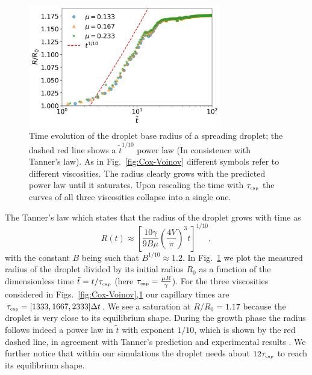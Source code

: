 \begin{figure}
    \centering
    \includegraphics[width=0.75\textwidth]{graphics/Fig_6_Tanners_law_slip_2_paper_rescaled_t.png}
    \caption{Time evolution of the droplet base radius of a spreading droplet; the dashed red line shows a $\tilde{t}^{1/10}$ power law (In consistence with Tanner's law). As in Fig.~\ref{fig:Cox-Voinov} different symbols refer to different viscosities. The radius clearly grows with the predicted power law until it saturates. Upon rescaling the time with $\tau_{\mbox{\tiny{cap}}}$ the curves of all three viscosities collapse into a single one.}
    \label{fig:Tanners_law}
\end{figure}
The Tanner's law which states that the radius of the droplet grows with time as
\begin{equation}
\label{eq:tanners_law}
    R(t)\approx \left[\frac{10\gamma}{9B\mu}\left(\frac{4V}{\pi}\right)^3 t\right]^{1/10},
\end{equation}
with the constant $B$ being such that $B^{1/10} \approx 1.2$.  
In Fig.~\ref{fig:Tanners_law} we plot the measured radius of the droplet divided by its initial radius $R_0$ as a function of the dimensionless time $\tilde{t} = t/\tau_{\mbox{\tiny{cap}}}$ (here $\tau_{\mbox{\tiny{cap}}} = \frac{\mu R}{\gamma}$). 
For the three viscosities considered in Figs.~\ref{fig:Cox-Voinov},\ref{fig:Tanners_law} our capillary times are $\tau_{\mbox{\tiny{cap}}} = [1333, 1667, 2333] \Delta t$. 
We see a saturation at $R/R_0=1.17$ because the droplet is very close to its equilibrium shape. 
During the growth phase the radius follows indeed a power law in $\tilde{t}$ with exponent $1/10$, which is shown by the red dashed line, in agreement with Tanner's prediction and experimental results \cite{riobooTimeEvolutionLiquid2002, jambon-puilletSpreadingDynamicsContact2018, cazabatDynamicsWettingEffects1986, chenExperimentsSpreadingDrop1988}.
We further notice that within our simulations the droplet needs about $12\tau_{\mbox{\tiny{cap}}}$ to reach its equilibrium shape.

